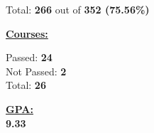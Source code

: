 \documentclass{article}
\begin{document}
\begin{minipage}{\textwidth}
\begin{minipage}{0.45\textwidth}
        Total: \textbf{266} out of \textbf{352 (75.56\%)}
    \end{minipage}%
    \hfill
    \begin{minipage}{0.45\textwidth}
        \begin{minipage}{0.45\textwidth}
            \begin{center}
                \textbf{\underline{Courses:}}
            \end{center}
            \raggedleft
            Passed: \textbf{24} \\
            Not Passed: \textbf{2}  \\
            Total: \textbf{26} \\
        \end{minipage}%
        \hfill %
        \begin{minipage}{0.45\textwidth}
            \textbf{\underline{GPA:}} \\
            \textbf{9.33}
        \end{minipage}
    \end{minipage}
\end{minipage}
\vspace{0.5cm}
\small %
\end{document}
